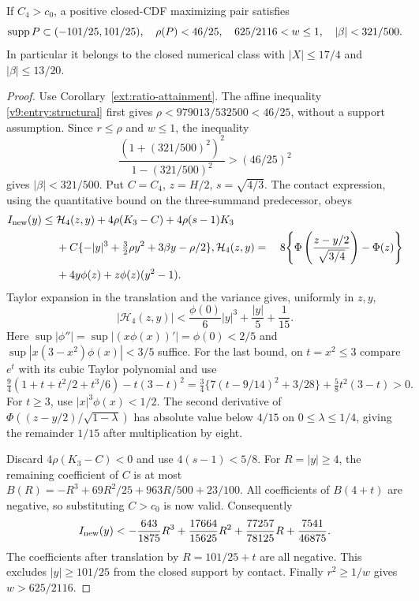 \begin{proposition}\label{ext:n4-localization}
If $C_4>c_0$, a positive closed-CDF maximizing pair satisfies
\[
 \operatorname{supp} P\subset(-101/25,101/25),\quad\rho(P)<46/25,
 \quad 625/2116<w\le1,\quad|\beta|<321/500.
\]
In particular it belongs to the closed numerical class with
$|X|\le17/4$ and $|\beta|\le13/20$.
\end{proposition}
\begin{proof}
Use Corollary~\ref{ext:ratio-attainment}.  The affine inequality
\eqref{v9:entry:structural} first gives
$\rho<979013/532500<46/25$, without a support assumption.
Since $r\le\rho$ and $w\le1$, the inequality
\[
 \frac{(1+(321/500)^2)^2}{1-(321/500)^2}>(46/25)^2
\]
gives $|\beta|<321/500$.
Put $C=C_4$, $z=H/2$, $s=\sqrt{4/3}$.  The contact expression,
using the quantitative bound on the three-summand predecessor, obeys
\begin{align*}
 I_{\rm new}(y)\le{}&\mathcal H_4(z,y)+4\rho(K_3-C)
                    +4\rho(s-1)K_3\\
 &+C\{-|y|^3+\tfrac32\rho y^2+3\beta y-\rho/2\},
\mathcal H_4(z,y)={}&8\!\left\{\Phi\left(\frac{z-y/2}{\sqrt{3/4}}\right)-\Phi(z)\right\}
                 \\
 &+4y\phi(z)+z\phi(z)(y^2-1).
\end{align*}
Taylor expansion in the translation and the variance gives, uniformly
in $z,y$,
\[
 |\mathcal H_4(z,y)|<\frac{\phi(0)}6|y|^3+\frac{|y|}{5}+\frac1{15}.
\]
Here $\sup|\phi''|=\sup|(x\phi(x))'|=\phi(0)<2/5$ and
$\sup|x(3-x^2)\phi(x)|<3/5$ suffice.  For the last bound, on
$t=x^2\le3$ compare $e^t$ with its cubic Taylor polynomial and use
\[
 \tfrac94(1+t+t^2/2+t^3/6)-t(3-t)^2
 =\tfrac34\{7(t-9/14)^2+3/28\}+\tfrac58t^2(3-t)>0.
\]
For $t\ge3$, use $|x|^3\phi(x)<1/2$.
The second derivative of
$\Phi((z-y/2)/\sqrt{1-\lambda})$ has absolute value below $4/15$
on $0\le\lambda\le1/4$, giving the remainder $1/15$ after
multiplication by eight.

Discard $4\rho(K_3-C)<0$ and use $4(s-1)<5/8$.
For $R=|y|\ge4$, the remaining coefficient of $C$ is at most
$B(R)=-R^3+69R^2/25+963R/500+23/100$.
All coefficients of $B(4+t)$ are negative, so substituting $C>c_0$
is now valid.  Consequently
\[
 I_{\rm new}(y)<-\frac{643}{1875}R^3+
 \frac{17664}{15625}R^2+\frac{77257}{78125}R+\frac{7541}{46875}.
\]
The coefficients after translation by $R=101/25+t$ are all negative.
This excludes $|y|\ge101/25$ from the closed support by contact.
Finally $r^2\ge1/w$ gives $w>625/2116$.
\end{proof}

